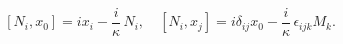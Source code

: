 \begin{equation}\label{6b}
 [N_i, x_0] = i x_i - \frac{i}\kappa\,  N_i, \quad [N_i, x_j]=i \delta_{ij} x_0 - \frac{i}\kappa\, \epsilon_{ijk} M_k.
\end{equation}

